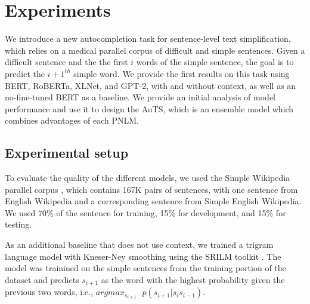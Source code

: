 \documentclass[11pt]{article}
\begin{document}
\begin{table}
    \centering
    \caption{Number of sentence pairs for General Domain and Medical Domain. The two corpora are exclusive.}
    \label{tab:medsize}
\end{table}

\section{Experiments} \label{sec:results}

We introduce a new autocompletion task for sentence-level text simplification, which relies on a medical parallel corpus of difficult and simple sentences.  Given a difficult sentence and the the first $i$ words of the simple sentence, the goal is to predict the $i+1^{th}$ simple word.  We provide the first results on this task using BERT, RoBERTa, XLNet, and GPT-2, with and without context, as well as an no-fine-tuned BERT as a baseline. We provide an initial analysis of model performance and use it to design the AuTS, which is an ensemble model which combines advantages of each PNLM.

\subsection{Experimental setup}

To evaluate the quality of the different models, we used the Simple Wikipedia parallel corpus \cite{kauchak2013improving}, which contains 167K pairs of sentences, with one sentence from English Wikipedia and a corresponding sentence from Simple English Wikipedia.  We used 70\% of the sentence for training, 15\% for development, and 15\% for testing.

As an additional baseline that does not use context, we trained a trigram language model with Kneser-Ney smoothing using the SRILM toolkit \cite{stolcke2002srilm}.  The model was trainined on the simple sentences from the training portion of the dataset and predicts $s_{i+1}$ as the word with the highest probability given the previous two words, i.e., $argmax_{s_{i+1}}\mbox{ } p(s_{i+1}| s_i s_{i-1})$.
\end{document}
